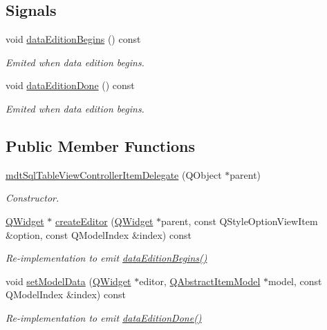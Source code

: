 \subsection*{Signals}
\begin{DoxyCompactItemize}
\item 
void \hyperlink{classmdt_sql_table_view_controller_item_delegate_a63f3c0cd443db6b60d4d088548e1566a}{data\-Edition\-Begins} () const 
\begin{DoxyCompactList}\small\item\em Emited when data edition begins. \end{DoxyCompactList}\item 
void \hyperlink{classmdt_sql_table_view_controller_item_delegate_a3967fd8b9766b30703e135af36f3bbbd}{data\-Edition\-Done} () const 
\begin{DoxyCompactList}\small\item\em Emited when data edition begins. \end{DoxyCompactList}\end{DoxyCompactItemize}
\subsection*{Public Member Functions}
\begin{DoxyCompactItemize}
\item 
\hyperlink{classmdt_sql_table_view_controller_item_delegate_a304a2fa2b1635342b73f7e5c9de2bf49}{mdt\-Sql\-Table\-View\-Controller\-Item\-Delegate} (Q\-Object $\ast$parent)
\begin{DoxyCompactList}\small\item\em Constructor. \end{DoxyCompactList}\item 
\hyperlink{class_q_widget}{Q\-Widget} $\ast$ \hyperlink{classmdt_sql_table_view_controller_item_delegate_a3a5bf3cc099da099f493fd2fb0298b4a}{create\-Editor} (\hyperlink{class_q_widget}{Q\-Widget} $\ast$parent, const Q\-Style\-Option\-View\-Item \&option, const Q\-Model\-Index \&index) const 
\begin{DoxyCompactList}\small\item\em Re-\/implementation to emit \hyperlink{classmdt_sql_table_view_controller_item_delegate_a63f3c0cd443db6b60d4d088548e1566a}{data\-Edition\-Begins()} \end{DoxyCompactList}\item 
void \hyperlink{classmdt_sql_table_view_controller_item_delegate_a07e3d9f0b2b41560a7e0b5e998f448ff}{set\-Model\-Data} (\hyperlink{class_q_widget}{Q\-Widget} $\ast$editor, \hyperlink{class_q_abstract_item_model}{Q\-Abstract\-Item\-Model} $\ast$model, const Q\-Model\-Index \&index) const 
\begin{DoxyCompactList}\small\item\em Re-\/implementation to emit \hyperlink{classmdt_sql_table_view_controller_item_delegate_a3967fd8b9766b30703e135af36f3bbbd}{data\-Edition\-Done()} \end{DoxyCompactList}\end{DoxyCompactItemize}


